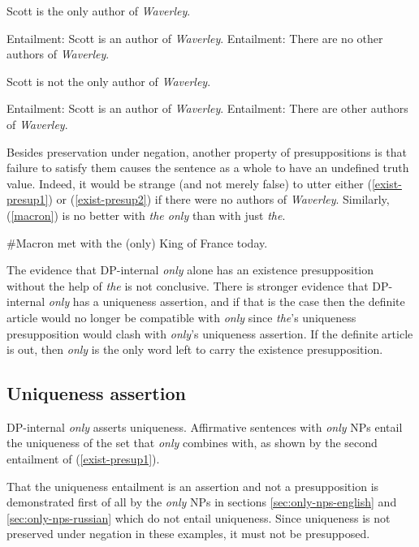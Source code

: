 \begin{exe}
	\ex \label{exist-presup1} Scott is the only author of \textit{Waverley}.
		\begin{xlist}
			\ex Entailment: Scott is an author of \textit{Waverley}.
			\ex Entailment: There are no other authors of \textit{Waverley}.
		\end{xlist}
	\ex \label{exist-presup2} Scott is not the only author of \textit{Waverley}.
		\begin{xlist}
			\ex Entailment: Scott is an author of \textit{Waverley}.
			\ex Entailment: There are other authors of \textit{Waverley}.
		\end{xlist}
\end{exe}

Besides preservation under negation, another property of presuppositions is that failure to satisfy them causes the sentence as a whole to have an undefined truth value. Indeed, it would be strange (and not merely false) to utter either (\ref{exist-presup1}) or (\ref{exist-presup2}) if there were no authors of \textit{Waverley}. Similarly, (\ref{macron}) is no better with \textit{the only} than with just \textit{the}.

\begin{exe}
	\ex \label{macron} \#Macron met with the (only) King of France today.
\end{exe}

The evidence that DP-internal \textit{only} alone has an existence presupposition without the help of \textit{the} is not conclusive. There is stronger evidence that DP-internal \textit{only} has a uniqueness assertion, and if that is the case then the definite article would no longer be compatible with \textit{only} since \textit{the}'s uniqueness presupposition would clash with \textit{only}'s uniqueness assertion. If the definite article is out, then \textit{only} is the only word left to carry the existence presupposition.

\subsection{Uniqueness assertion}
DP-internal \textit{only} asserts uniqueness. Affirmative sentences with \textit{only} NPs entail the uniqueness of the set that \textit{only} combines with, as shown by the second entailment of (\ref{exist-presup1}).

That the uniqueness entailment is an assertion and not a presupposition is demonstrated first of all by the \textit{only} NPs in sections \ref{sec:only-nps-english} and \ref{sec:only-nps-russian} which do not entail uniqueness. Since uniqueness is not preserved under negation in these examples, it must not be presupposed.

